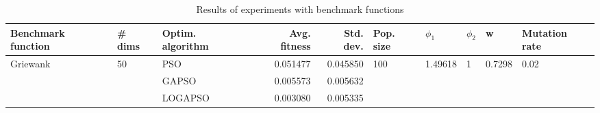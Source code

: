 \begin{table}
\centering
\caption{Results of experiments with benchmark functions}
\begin{tabular}{lllrrlllll}
\toprule
       Benchmark function &             \# dims & Optim. algorithm &  Avg. fitness &  Std. dev. &            Pop. size &               $\phi_{1}$ &         $\phi_{2}$ &                       w &         Mutation rate \\
\midrule
\multirow{3}{*}{Griewank} & \multirow{3}{*}{50} &              PSO &      0.051477 &   0.045850 & \multirow{3}{*}{100} & \multirow{3}{*}{1.49618} & \multirow{3}{*}{1} & \multirow{3}{*}{0.7298} & \multirow{3}{*}{0.02} \\
                          &                     &            GAPSO &      0.005573 &   0.005632 &                      &                          &                    &                         &                       \\
                          &                     &          LOGAPSO &      0.003080 &   0.005335 &                      &                          &                    &                         &                       \\
\bottomrule
\end{tabular}
\end{table}
